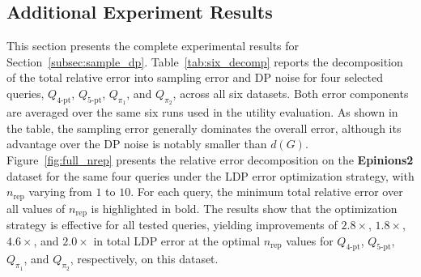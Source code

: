 \subsection{Additional Experiment Results}
\label{app:exp}


This section presents the complete experimental results for Section~\ref{subsec:sample_dp}.
Table~\ref{tab:six_decomp} reports the decomposition of the total relative error into sampling error and DP noise for four selected queries, $Q_{\mathrm{4\text{-}pt}}$, $Q_{\mathrm{5\text{-}pt}}$, $Q_{\pi_1}$, and $Q_{\pi_2}$, across all six datasets.
Both error components are averaged over the same six runs used in the utility evaluation.
As shown in the table, the sampling error generally dominates the overall error, although its advantage over the DP noise is notably smaller than $d(G)$.
Figure~\ref{fig:full_nrep} presents the relative error decomposition on the \textbf{Epinions2} dataset for the same four queries under the LDP error optimization strategy, with $n_{\text{rep}}$ varying from $1$ to $10$.
For each query, the minimum total relative error over all values of $n_{\text{rep}}$ is highlighted in bold.
The results show that the optimization strategy is effective for all tested queries, yielding improvements of $2.8\times$, $1.8\times$, $4.6\times$, and $2.0\times$ in total LDP error at the optimal $n_{\text{rep}}$ values for $Q_{\mathrm{4\text{-}pt}}$, $Q_{\mathrm{5\text{-}pt}}$, $Q_{\pi_1}$, and $Q_{\pi_2}$, respectively, on this dataset.





